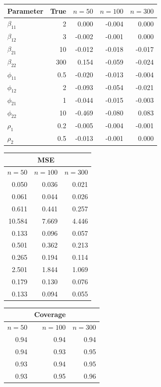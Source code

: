 \documentclass[useAMS,referee]{biom}
\begin{document}
\begin{table}[htb]
\begin{minipage}[b]{0.43\textwidth}
\begin{tabular}{lrrrr}
	Parameter	&  True & $n=50$ & $n=100$ & $n=300$   \\ 			\midrule 
	$\beta_{11}$ &	2&0.000
	&-0.004&	0.000\\
	$\beta_{12}$ &	3&-0.002
	&	-0.001&	0.000\\
	$\beta_{21}$&10& -0.012
	&	-0.018&	-0.017\\
	$\beta_{22}$&300&0.154
	&	-0.059&	-0.024\\
	$\phi_{11}$	&0.5& -0.020
	&	-0.013&	-0.004\\
	$\phi_{12}$&2&	-0.093
	&	-0.054&	-0.021\\
	$\phi_{21}$	&1&	-0.044
	&	-0.015&	-0.003\\
	$\phi_{22}$	&10&-0.469
	&-0.080&	0.083	\\
	$\rho_1$	&0.2&-0.005
	&-0.004&-0.001	\\
	$\rho_2$&	0.5	&-0.013
	&-0.001&	0.000\\
\end{tabular}
\end{minipage}
\begin{minipage}[b]{0.28\textwidth}
\begin{tabular}{rrr} 
	& \multicolumn{1}{c}{MSE}  &\\ 
	\midrule
	$n=50$ & $n=100$ & $n=300$   \\ 	
	\midrule 
	0.050&	0.036&	0.021\\
	0.061&	0.044&	0.026\\
	0.611&	0.441&	0.257\\
	10.584&	7.669&	4.446\\
	0.133&	0.096&	0.057\\
	0.501&	0.362&	0.213\\
	0.265&	0.194&	0.114\\
	2.501&	1.844&	1.069\\
	0.179&	0.130&	0.076\\
	0.133&	0.094&	0.055\\
\end{tabular}
\end{minipage}
\begin{minipage}[b]{.1\textwidth}
\begin{tabular}{rrr} 
	& \multicolumn{1}{c}{Coverage}  &\\ 
	\hline
	$n=50$ & $n=100$ & $n=300$   \\ 	
	\hline 
	0.94&	0.94&	0.94\\
	0.94&	0.93&	0.95\\
	0.93&	0.94&	0.95\\
	0.93&	0.95&	0.96\\

\end{tabular}
\end{minipage}
\end{table}
\end{document}
